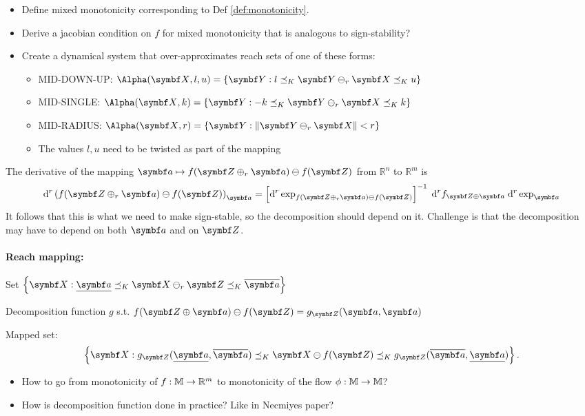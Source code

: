 \begin{itemize}
  \item Define mixed monotonicity corresponding to Def \eqref{def:monotonicity}.
  \item Derive a jacobian condition on $f$ for mixed monotonicity that is analogous to sign-stability?
  \item Create a dynamical system that over-approximates reach sets of one of these forms:
  \begin{itemize}
    \item MID-DOWN-UP: $\Alpha(\X, l, u) = \{ \Y : l \preceq_K \Y \ominus_r \X \preceq_K u \}$
    \item MID-SINGLE: $\Alpha(\X, k) = \{ \Y : -k \preceq_K \Y \ominus_r \X \preceq_K k \}$
    \item MID-RADIUS: $\Alpha(\X, r) = \{ \Y : \| \Y \ominus_r \X \| < r \}$
    \item The values $l, u$ need to be twisted as part of the mapping
  \end{itemize}
\end{itemize}

The derivative of the mapping $\a \mapsto f(\Z \oplus_r \a) \ominus f(\Z)$ from $\mathbb{R}^n$ to $\mathbb{R}^m$ is
\begin{equation}
\mathrm{d}^r \left( f(\Z \oplus_r \a) \ominus f(\Z) \right)_\a = \left[ \mathrm{d}^r \exp_{f(\Z \oplus_r \a) \ominus f(\Z)} \right]^{-1} \; \mathrm{d}^r f_{\Z \oplus \a} \; \mathrm{d}^r \exp_\a
\end{equation}
It follows that this is what we need to make sign-stable, so the decomposition should depend on it. Challenge is that the decomposition may have to depend on both $\a$ and on $\Z$.

\paragraph{Reach mapping:}

Set $\left\{ \X : \underline \a \preceq_K \X \ominus_r \Z \preceq_K \overline \a \right\}$

Decomposition function $g$ s.t. $f(\Z \oplus \a) \ominus f(\Z) = g_{\Z}(\a, \a)$

Mapped set:
\begin{equation}
  \left\{ \X : g_\Z(\underline \a, \overline \a) \preceq_K \X \ominus f(\Z) \preceq_K g_\Z(\overline \a, \underline \a) \right\}.
\end{equation}

\begin{itemize}
  \item How to go from monotonicity of $f : \mathbb{M} \rightarrow \mathbb{R}^m$ to monotonicity of the flow $\phi : \mathbb{M} \rightarrow \mathbb{M}$?
  \item How is decomposition function done in practice? Like in Necmiyes paper?
\end{itemize}

